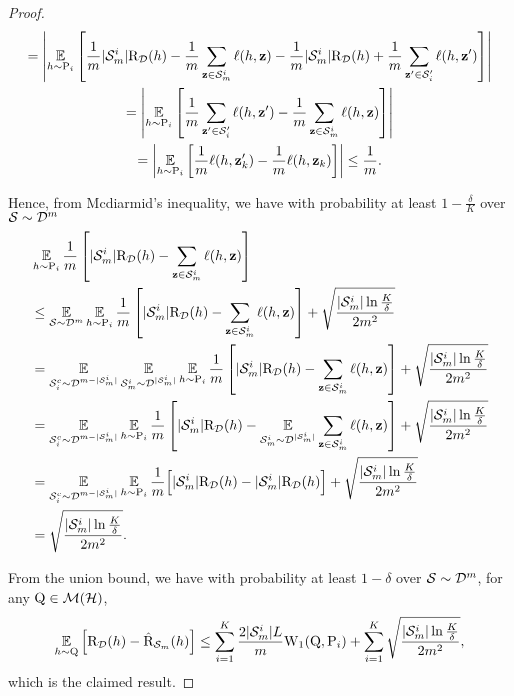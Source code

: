 \begin{noaddcontents}
\begin{proof}
\begin{multline*}
    = \LN \EE_{h\sim\P_i} \LB \frac{1}{m}|\Sm^{i}|\Risk_{\D}(h) - \frac{1}{m}\sum_{\z\in\Sm^{i}} \loss(h, \z) - \frac{1}{m}|\Sm^{i}|\Risk_{\D}(h) + \frac{1}{m}\sum_{\z'\in\S'_i} \loss(h, \z')\RB \right\vert\\
    = \LN \EE_{h\sim\P_i} \LB \frac{1}{m}\sum_{\z'\in\S'_i} \loss(h, \z') - \frac{1}{m}\sum_{\z\in\Sm^{i}} \loss(h, \z)\RB \right\vert\\
    = \LN \EE_{h\sim\P_i} \LB \frac{1}{m}\loss(h, \z'_k) - \frac{1}{m}\loss(h, \z_k)\RB \right\vert
    \le \frac{1}{m}.
    \end{multline*}
    
    Hence, from Mcdiarmid's inequality, we have with probability at least $1-\frac{\delta}{K}$ over $\S\sim\D^{m}$
    \begin{align*}
    &\EE_{h\sim\P_i} \frac{1}{m}\LB |\Sm^{i}|\Risk_{\D}(h) - \sum_{\z\in\Sm^{i}} \loss(h, \z) \RB \\ &\le \EE_{\S\sim\D^{m}}\EE_{h\sim\P_i} \frac{1}{m}\LB |\Sm^{i}|\Risk_{\D}(h) - \sum_{\z\in\Sm^{i}} \loss(h, \z) \RB + \sqrt{\frac{|\Sm^{i}|\ln\frac{K}{\delta}}{2m^2}}\\
    &= \EE_{\S^c_i\sim\D^{m-|\Sm^{i}|}}\EE_{\Sm^{i}\sim\D^{|\Sm^{i}|}}\EE_{h\sim\P_i} \frac{1}{m}\LB |\Sm^{i}|\Risk_{\D}(h) - \sum_{\z\in\Sm^{i}} \loss(h, \z) \RB + \sqrt{\frac{|\Sm^{i}|\ln\frac{K}{\delta}}{2m^2}}\\
    &= \EE_{\S^c_i\sim\D^{m-|\Sm^{i}|}}\EE_{h\sim\P_i} \frac{1}{m}\LB |\Sm^{i}|\Risk_{\D}(h) - \EE_{\Sm^{i}\sim\D^{|\Sm^{i}|}}\sum_{\z\in\Sm^{i}} \loss(h, \z) \RB + \sqrt{\frac{|\Sm^{i}|\ln\frac{K}{\delta}}{2m^2}}\\
    &= \EE_{\S^c_i\sim\D^{m-|\Sm^{i}|}}\EE_{h\sim\P_i} \frac{1}{m}\Big[ |\Sm^{i}|\Risk_{\D}(h) - |\Sm^{i}|\Risk_{\D}(h)\Big] + \sqrt{\frac{|\Sm^{i}|\ln\frac{K}{\delta}}{2m^2}}\\
    &= \sqrt{\frac{|\Sm^{i}|\ln\frac{K}{\delta}}{2m^2}}.
    \end{align*}
    
    From the union bound, we have with probability at least $1-\delta$ over $\S\sim\D^m$, for any $\Q\in\Mcal(\H)$,
    \begin{align*}
    \EE_{h\sim\Q}\Big[ \Risk_{\D}(h) - \Riskhat_{\Sm}(h) \Big] \le \sum_{i=1}^{K} \frac{2|\Sm^{i}|L}{m}\W_{1}(\Q, \P_i) + \sum_{i=1}^{K} \sqrt{\frac{|\Sm^{i}|\ln\frac{K}{\delta}}{2m^2}},
    \end{align*}
    which is the claimed result.
    \end{proof}
    

\end{noaddcontents}
